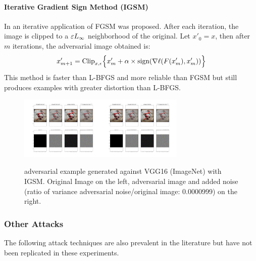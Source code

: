 \paragraph{Iterative Gradient Sign Method (IGSM)}
\label{igsm-s}
In \cite{kurakin_adversarial_2016}
  an iterative application of FGSM was proposed. After each
  iteration, the image is clipped to a $\varepsilon L_\infty$ neighborhood of the original. Let $x'_0 = x$, then after $m$ iterations, the adversarial image obtained is:
\begin{equation}
x_{m+1}' = \text{Clip}_{x,\epsilon} \Bigl\{x_m' + \alpha \times \text{sign}(\nabla \ell (F(x'_m),x'_m))  \Bigr\} 
\label{igsm}
\end{equation}
This method is faster than L-BFGS and more reliable than FGSM but still produces examples with greater distortion than L-BFGS. 
\begin{figure}[H]
  \centering
\includegraphics[trim=200 110 1200 102, clip,width=4cm]{c1_figures/ILSVRC2012_val_00002900summary_plot.png}\includegraphics[trim=900 110 500 102, clip,width=4cm]{c1_figures/ILSVRC2012_val_00002900summary_plot.png}
\label{fgsmhip}
\caption{adversarial example generated against VGG16 (ImageNet) with IGSM. Original Image on the left, adversarial image and added noise (ratio of variance adversarial noise/original image: 0.0000999) on the right. }
\end{figure}



\subsubsection{Other Attacks}
The following attack techniques are also prevalent in the literature but have not been replicated in these experiments. 

